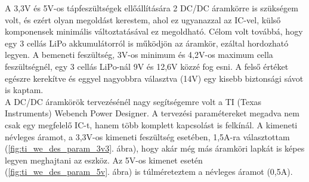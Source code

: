 \documentclass[../main.tex]{subfiles}
\begin{document}
            
            A 3,3V és 5V-os tápfeszültségek ellőállítására 2 DC/DC áramkörre is szükségem volt, és ezért olyan megoldást kerestem, ahol ez ugyanazzal az IC-vel, külső komponensek minimális változtatásával ez megoldható. Célom volt továbbá, hogy egy 3 cellás LiPo akkumulátorról is működjön az áramkör, ezáltal hordozható legyen. A bemeneti feszültség, 3V-os minimum és 4,2V-os maximum cella feszültségnél, egy 3 cellás LiPo-nál 9V és 12,6V közzé fog esni. A felső értéket egészre kerekítve és eggyel nagyobbra választva (14V) egy kisebb biztonsági sávot is kaptam.
            \\
            A DC/DC áramkörök tervezésénél nagy segítségemre volt a TI (Texas Instruments) Webench Power Designer.
            A tervezési paramétereket megadva nem csak egy megfelelő IC-t, hanem több komplett kapcsolást is felkínál. A kimeneti névleges áramot, a 3,3V-os kimeneti feszültség esetében, 1,5A-ra választottam (\ref{fig:ti_we_des_param_3v3}. ábra), hogy akár még más áramköri lapkát is képes legyen meghajtani az eszköz. Az 5V-os kimenet esetén (\ref{fig:ti_we_des_param_5v}. ábra) is túlméreteztem a névleges áramot (0,5A).
            \begin{figure}[h!] %
                \begin{floatrow}
                \end{floatrow}
            \end{figure}
            
\end{document}
